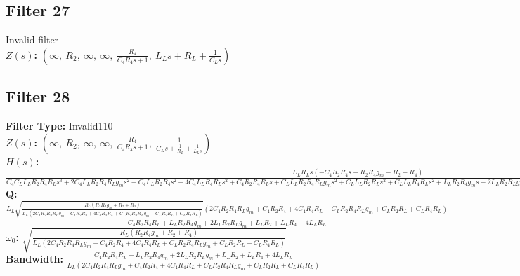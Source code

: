 \documentclass{article}
\begin{document}
\subsection*{Filter 27}
Invalid filter \\ 
\textbf{$Z(s)$:} $\left( \infty, \  R_{2}, \  \infty, \  \infty, \  \frac{R_{4}}{C_{4} R_{4} s + 1}, \  L_{L} s + R_{L} + \frac{1}{C_{L} s}\right)$ \\ 
\subsection*{Filter 28}
\textbf{Filter Type:} Invalid110 \\ 
\textbf{$Z(s)$:} $\left( \infty, \  R_{2}, \  \infty, \  \infty, \  \frac{R_{4}}{C_{4} R_{4} s + 1}, \  \frac{1}{C_{L} s + \frac{1}{R_{L}} + \frac{1}{L_{L} s}}\right)$ \\ 
\textbf{$H(s)$:} $\frac{L_{L} R_{L} s \left(- C_{4} R_{2} R_{4} s + R_{2} R_{4} g_{m} - R_{2} + R_{4}\right)}{C_{4} C_{L} L_{L} R_{2} R_{4} R_{L} s^{3} + 2 C_{4} L_{L} R_{2} R_{4} R_{L} g_{m} s^{2} + C_{4} L_{L} R_{2} R_{4} s^{2} + 4 C_{4} L_{L} R_{4} R_{L} s^{2} + C_{4} R_{2} R_{4} R_{L} s + C_{L} L_{L} R_{2} R_{4} R_{L} g_{m} s^{2} + C_{L} L_{L} R_{2} R_{L} s^{2} + C_{L} L_{L} R_{4} R_{L} s^{2} + L_{L} R_{2} R_{4} g_{m} s + 2 L_{L} R_{2} R_{L} g_{m} s + L_{L} R_{2} s + L_{L} R_{4} s + 4 L_{L} R_{L} s + R_{2} R_{4} R_{L} g_{m} + R_{2} R_{L} + R_{4} R_{L}}$ \\ 
\textbf{Q:} $\frac{L_{L} \sqrt{\frac{R_{L} \left(R_{2} R_{4} g_{m} + R_{2} + R_{4}\right)}{L_{L} \left(2 C_{4} R_{2} R_{4} R_{L} g_{m} + C_{4} R_{2} R_{4} + 4 C_{4} R_{4} R_{L} + C_{L} R_{2} R_{4} R_{L} g_{m} + C_{L} R_{2} R_{L} + C_{L} R_{4} R_{L}\right)}} \left(2 C_{4} R_{2} R_{4} R_{L} g_{m} + C_{4} R_{2} R_{4} + 4 C_{4} R_{4} R_{L} + C_{L} R_{2} R_{4} R_{L} g_{m} + C_{L} R_{2} R_{L} + C_{L} R_{4} R_{L}\right)}{C_{4} R_{2} R_{4} R_{L} + L_{L} R_{2} R_{4} g_{m} + 2 L_{L} R_{2} R_{L} g_{m} + L_{L} R_{2} + L_{L} R_{4} + 4 L_{L} R_{L}}$ \\ 
\textbf{$\omega_0$:} $\sqrt{\frac{R_{L} \left(R_{2} R_{4} g_{m} + R_{2} + R_{4}\right)}{L_{L} \left(2 C_{4} R_{2} R_{4} R_{L} g_{m} + C_{4} R_{2} R_{4} + 4 C_{4} R_{4} R_{L} + C_{L} R_{2} R_{4} R_{L} g_{m} + C_{L} R_{2} R_{L} + C_{L} R_{4} R_{L}\right)}}$ \\ 
\textbf{Bandwidth:} $\frac{C_{4} R_{2} R_{4} R_{L} + L_{L} R_{2} R_{4} g_{m} + 2 L_{L} R_{2} R_{L} g_{m} + L_{L} R_{2} + L_{L} R_{4} + 4 L_{L} R_{L}}{L_{L} \left(2 C_{4} R_{2} R_{4} R_{L} g_{m} + C_{4} R_{2} R_{4} + 4 C_{4} R_{4} R_{L} + C_{L} R_{2} R_{4} R_{L} g_{m} + C_{L} R_{2} R_{L} + C_{L} R_{4} R_{L}\right)}$ \\ 
\end{document}
